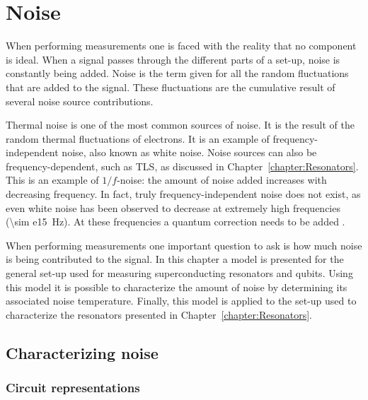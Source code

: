 \documentclass[12pt]{report}
\begin{document}
\chapter{Noise}


When performing measurements one is faced with the reality that no component is ideal. When a signal passes through the different parts of a set-up, noise is constantly being added. Noise is the term given for all the random fluctuations that are added to the signal. These fluctuations are the cumulative result of several noise source contributions.

Thermal noise is one of the most common sources of noise. It is the result of the random thermal fluctuations of electrons. It is an example of frequency-independent noise, also known as white noise. Noise sources can also be frequency-dependent, such as TLS, as discussed in Chapter~\ref{chapter:Resonators}. This is an example of $1/f$-noise: the amount of noise added increases with decreasing frequency. In fact, truly frequency-independent noise does not exist, as even white noise has been observed to decrease at extremely high frequencies (\SI{\sim e15}{\hertz}). At these frequencies a quantum correction needs to be added \cite[p.~50]{vasilescu2006electronic}.

When performing measurements one important question to ask is how much noise is being contributed to the signal. In this chapter a model is presented for the general set-up used for measuring superconducting resonators and qubits. Using this model it is possible to characterize the amount of noise by determining its associated noise temperature. Finally, this model is applied to the set-up used to characterize the resonators presented in Chapter~\ref{chapter:Resonators}.

\section{Characterizing noise}

\subsection{Circuit representations}
\end{document}
